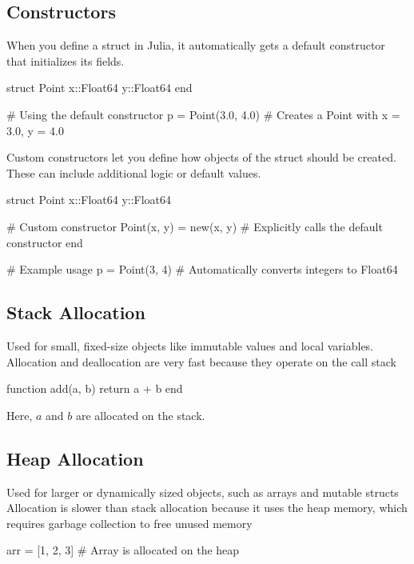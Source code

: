 \documentclass{report}
\begin{document}
     \subsection{Constructors}
     \bigbreak \noindent 
     When you define a struct in Julia, it automatically gets a default constructor that initializes its fields.
     \bigbreak \noindent 
     \begin{jlcode}
         struct Point
             x::Float64
             y::Float64
         end

         # Using the default constructor
         p = Point(3.0, 4.0)  # Creates a Point with x = 3.0, y = 4.0
     \end{jlcode}
     \bigbreak \noindent 
     Custom constructors let you define how objects of the struct should be created. These can include additional logic or default values.
     \bigbreak \noindent 
     \begin{jlcode}
         struct Point
             x::Float64
             y::Float64

             # Custom constructor
             Point(x, y) = new(x, y)  # Explicitly calls the default constructor
         end

         # Example usage
         p = Point(3, 4)  # Automatically converts integers to Float64
     \end{jlcode}





     \pagebreak 
     \bigbreak \noindent 
     \subsection{Stack Allocation}
     \bigbreak \noindent 
     Used for small, fixed-size objects like immutable values and local variables. Allocation and deallocation are very fast because they operate on the call stack
     \bigbreak \noindent 
     \begin{jlcode}
         function add(a, b)
             return a + b
         end
     \end{jlcode}
     \bigbreak \noindent 
     Here, $a$ and $b$ are allocated on the stack.
     \bigbreak \noindent 
     \subsection{Heap Allocation}
     \bigbreak \noindent 
     Used for larger or dynamically sized objects, such as arrays and mutable structs
     Allocation is slower than stack allocation because it uses the heap memory, which requires garbage collection to free unused memory
     \bigbreak \noindent 
     \begin{jlcode}
     arr = [1, 2, 3]  # Array is allocated on the heap
     \end{jlcode}
\end{document}
